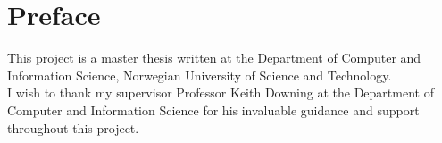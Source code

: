 \section*{Preface}


\noindent This project is a master thesis written at the Department of Computer and Information Science, Norwegian University of Science and Technology.\\

\noindent I wish to thank my supervisor Professor Keith Downing at the Department of Computer and Information Science for his invaluable guidance and support throughout this project.\\